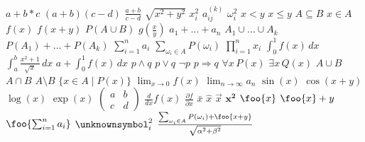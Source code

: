 $a+b*c$
$(a+b)(c-d)$
$\frac{a+b}{c-d}$
$\sqrt{x^2+y^2}$
$x_i^2$
$a_{ij}^{(k)}$
$\omega_i^2$
$x<y$
$x\leq y$
$A\subseteq B$
$x\in A$
$f(x)$
$f(x+y)$
$P(A\cup B)$
$g(\frac{x}{y})$
$a_1+\dots+a_n$
$A_1\cup\dots\cup A_k$
$P(A_1)+\dots+P(A_k)$
$\sum_{i=1}^{n} a_i$
$\sum_{\omega_i\in A} P(\omega_i)$
$\prod_{i=1}^{n} x_i$
$\int_0^1 f(x)\,dx$
$\int_a^b \frac{x^2+1}{\sqrt{x}}\,dx$
$a+\int_0^1 f(x)\,dx$
$p\wedge q$
$p\vee q$
$\neg p$
$p\Rightarrow q$
$\forall x\, P(x)$
$\exists x\, Q(x)$
$A\cup B$
$A\cap B$
$A\setminus B$
$\{x\in A\mid P(x)\}$
$\lim_{x\to 0} f(x)$
$\lim_{n\to\infty} a_n$
$\sin(x)$
$\cos(x+y)$
$\log(x)$
$\exp(x)$
$\begin{pmatrix}a & b \\ c & d\end{pmatrix}$
$\frac{d}{dx}f(x)$
$\frac{\partial f}{\partial x}$
$\bar{x}$
$\hat{x}$
$\vec{x}$
$\boldsymbol{x^2}$
$\foo{x}$
$\foo{x}+y$
$\foo{\sum_{i=1}^{n}a_i}$
$\unknownsymbol_i^2$
$\frac{
  \sum_{\omega_i\in A} P(\omega_i)+\foo{x+y}
}{
  \sqrt{\alpha^2+\beta^2}
}$
